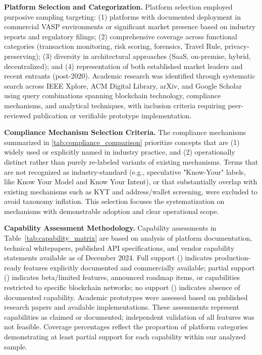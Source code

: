 \documentclass[conference,compsoc]{IEEEtran}
\begin{document}
\noindent\textbf{Platform Selection and Categorization.}
Platform selection employed purposive sampling targeting: (1) platforms with documented deployment in commercial VASP environments or significant market presence based on industry reports and regulatory filings; (2) comprehensive coverage across functional categories (transaction monitoring, risk scoring, forensics, Travel Rule, privacy-preserving); (3) diversity in architectural approaches (SaaS, on-premise, hybrid, decentralized); and (4) representation of both established market leaders and recent entrants (post-2020). Academic research was identified through systematic search across IEEE Xplore, ACM Digital Library, arXiv, and Google Scholar using query combinations spanning blockchain technology, compliance mechanisms, and analytical techniques, with inclusion criteria requiring peer-reviewed publication or verifiable prototype implementation.

\noindent\textbf{Compliance Mechanism Selection Criteria.}
The compliance mechanisms summarized in \autoref{tab:compliance_comparison} prioritize concepts that are (1) widely used or explicitly named in industry practice, and (2) operationally distinct rather than purely re-labeled variants of existing mechanisms. Terms that are not recognized as industry-standard (e.g., speculative "Know-Your" labels, like Know Your Model and Know Your Intent), or that substantially overlap with existing mechanisms such as KYT and address/wallet screening, were excluded to avoid taxonomy inflation. This selection focuses the systematization on mechanisms with demonstrable adoption and clear operational scope.

\noindent\textbf{Capability Assessment Methodology.}
Capability assessments in Table~\ref{tab:capability_matrix} are based on analysis of platform documentation, technical whitepapers, published API specifications, and vendor capability statements available as of December 2024. Full support (\fullcirc) indicates production-ready features explicitly documented and commercially available; partial support (\halfcirc) indicates beta/limited features, announced roadmap items, or capabilities restricted to specific blockchain networks; no support (\emptycirc) indicates absence of documented capability. Academic prototypes were assessed based on published research papers and available implementations. These assessments represent capabilities as claimed or documented; independent validation of all features was not feasible. Coverage percentages reflect the proportion of platform categories demonstrating at least partial support for each capability within our analyzed sample.
\end{document}

